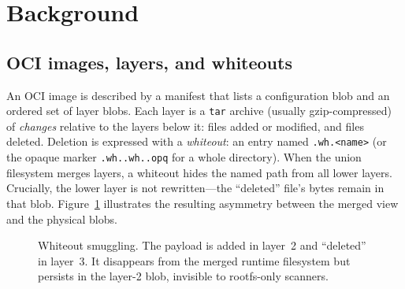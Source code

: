\documentclass[sigconf,nonacm]{acmart}
\begin{document}
\section{Background}
\subsection{OCI images, layers, and whiteouts}
An OCI image is described by a manifest that lists a configuration blob and an
ordered set of layer blobs. Each layer is a \texttt{tar} archive (usually
gzip-compressed) of \emph{changes} relative to the layers below it: files added
or modified, and files deleted. Deletion is expressed with a \emph{whiteout}: an
entry named \texttt{.wh.\textless name\textgreater} (or the opaque marker
\texttt{.wh..wh..opq} for a whole directory). When the union filesystem merges
layers, a whiteout hides the named path from all lower layers. Crucially, the
lower layer is not rewritten---the ``deleted'' file's bytes remain in that blob.
Figure~\ref{fig:whiteout} illustrates the resulting asymmetry between the merged
view and the physical blobs.

\begin{figure}[t]
\centering
{}
\caption{Whiteout smuggling. The payload is added in layer~2 and ``deleted'' in
layer~3. It disappears from the merged runtime filesystem but persists in the
layer-2 blob, invisible to rootfs-only scanners.}
\label{fig:whiteout}
\end{figure}
\end{document}
